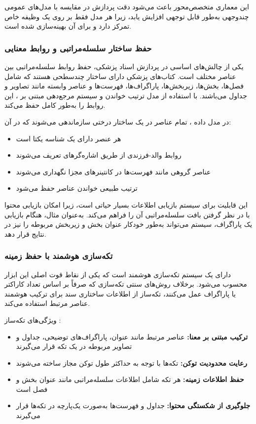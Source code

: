 \noindent
این معماری متخصص‌محور باعث می‌شود دقت پردازش در مقایسه با مدل‌های عمومی چندوجهی به‌طور قابل توجهی افزایش یابد، زیرا هر مدل فقط بر روی یک وظیفه خاص تمرکز دارد و برای آن بهینه‌سازی شده است.

\subsubsection{حفظ ساختار سلسله‌مراتبی و روابط معنایی}
یکی از چالش‌های اساسی در پردازش اسناد پزشکی، حفظ روابط سلسله‌مراتبی بین عناصر مختلف است. کتاب‌های پزشکی دارای ساختار چندسطحی هستند که شامل فصل‌ها، بخش‌ها، زیربخش‌ها، پاراگراف‌ها، فهرست‌ها و عناصر وابسته مانند تصاویر و جداول می‌باشند.  با استفاده از مدل ترتیب خواندن  و سیستم مرجع‌دهی مبتنی بر ، این روابط را به‌طور کامل حفظ می‌کند.

\noindent
در مدل داده ، تمام عناصر در یک ساختار درختی سازماندهی می‌شوند که در آن:
\begin{itemize}
    \item هر عنصر دارای یک شناسه یکتا است
    \item روابط والد-فرزندی از طریق اشاره‌گرهای  تعریف می‌شوند
    \item عناصر گروهی مانند فهرست‌ها در کانتینرهای مجزا نگهداری می‌شوند
    \item ترتیب طبیعی خواندن عناصر حفظ می‌شود
\end{itemize}

\noindent
این قابلیت برای سیستم بازیابی اطلاعات بسیار حیاتی است، زیرا امکان بازیابی محتوا با در نظر گرفتن بافت سلسله‌مراتبی آن را فراهم می‌کند. به‌عنوان مثال، هنگام بازیابی یک پاراگراف، سیستم می‌تواند به‌طور خودکار عنوان بخش و زیربخش مربوطه را نیز در نتایج قرار دهد.

\subsubsection{تکه‌سازی هوشمند با حفظ زمینه}
 دارای یک سیستم تکه‌سازی هوشمند  است که یکی از نقاط قوت اصلی این ابزار محسوب می‌شود. برخلاف روش‌های سنتی تکه‌سازی که صرفاً بر اساس تعداد کاراکتر یا پاراگراف عمل می‌کنند، تکه‌ساز  از اطلاعات ساختاری سند برای ترکیب هوشمند عناصر مرتبط استفاده می‌کند.

\noindent
ویژگی‌های تکه‌ساز :
\begin{itemize}
    \item \textbf{ترکیب مبتنی بر معنا:} عناصر مرتبط مانند عنوان، پاراگراف‌های توضیحی، جداول و تصاویر مربوطه در یک تکه قرار می‌گیرند
    \item \textbf{رعایت محدودیت توکن:} تکه‌ها با توجه به حداکثر طول توکن مجاز ساخته می‌شوند
    \item \textbf{حفظ اطلاعات زمینه:} هر تکه شامل اطلاعات سلسله‌مراتبی مانند عنوان بخش و فصل است
    \item \textbf{جلوگیری از شکستگی محتوا:} جداول و فهرست‌ها به‌صورت یک‌پارچه در تکه‌ها قرار می‌گیرند
\end{itemize}

